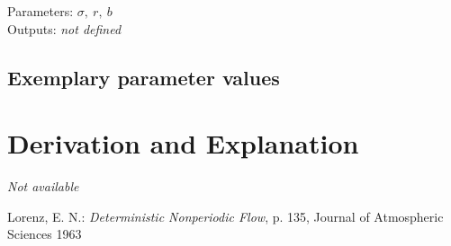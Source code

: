 \documentclass[10pt,a4paper]{article}
\begin{document}
	
	\noindent
	Parameters: $\sigma,~r,~b$ %
	\\
	Outputs: \textit{\textlangle not defined\textrangle} 
	
	
	
	\subsection{Exemplary parameter values}
	

	
	\section{Derivation and Explanation} %
	
	\textit{Not available}
	
	
	\begin{thebibliography}{10}		
		Lorenz, E. N.: 
		\textit{Deterministic Nonperiodic Flow}, p. 135, Journal of Atmospheric Sciences 1963
	\end{thebibliography}
\end{document}
